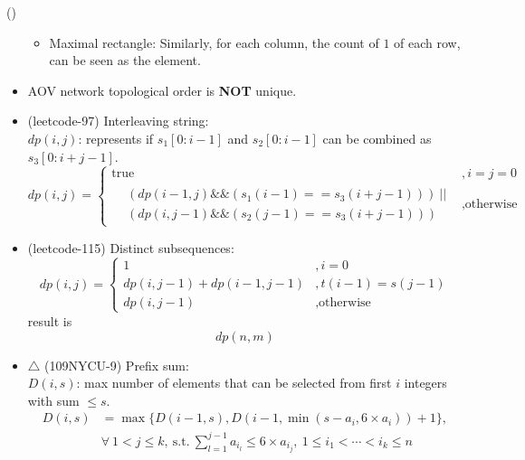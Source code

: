 \begin{theorem}{()}
\begin{itemize}
\begin{itemize}
            \item Maximal rectangle: Similarly, for each column, the count of $1$ of each row, can be seen as the element.
        \end{itemize}
        \item AOV network topological order is \textbf{NOT} unique.
        \item (leetcode-97) Interleaving string: \\
        $dp(i, j)$: represents if $s_1[0: i - 1]$ and $s_2[0: i - 1]$ can be combined as $s_3[0: i + j - 1]$. \begin{equation}
            dp(i, j) = \begin{cases}
                \text{true} &, i = j = 0 \\
                \begin{aligned}
                    & (dp(i - 1, j) \&\& (s_1(i - 1) == s_3(i + j - 1))) \ || \\
                    & (dp(i, j - 1) \&\& (s_2(j - 1) == s_3(i + j - 1)))
                \end{aligned} &, \text{otherwise}
            \end{cases}
        \end{equation}
        \item (leetcode-115) Distinct subsequences: \begin{equation}
            dp(i, j) = \begin{cases}
                1 &, i = 0 \\
                dp(i, j - 1) + dp(i - 1, j - 1) &, t(i - 1) = s(j - 1) \\
                dp(i, j - 1) &, \text{otherwise}
            \end{cases}            
        \end{equation} result is \begin{equation}
            dp(n, m)
        \end{equation}
        \item $\bigtriangleup$ (109NYCU-9) Prefix sum: \\
        $D(i, s)$: max number of elements that can be selected from first $i$ integers with sum $\le s$. \begin{equation}
            \begin{aligned}
                D(i, s) & = \max\{D(i - 1, s), D(i - 1, \min(s - a_i, 6 \times a_i)) + 1\}, \\
                & \forall \ 1 < j \le k, \ \text{s.t.} \ \sum_{l = 1}^{j - 1}a_{i_l} \le 6 \times a_{i_j}, \ 1 \le i_1 < \cdots < i_k \le n

\end{aligned}
\end{equation}
\end{itemize}
\end{theorem}
